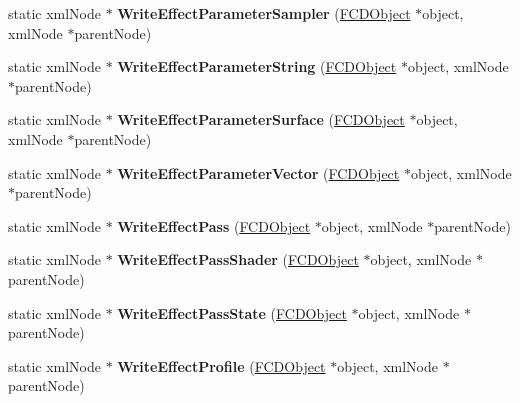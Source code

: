 \begin{DoxyCompactItemize}
\item 
\hypertarget{classFArchiveXML_a172090be69e194517e618dac85125112}{
static xmlNode $\ast$ {\bfseries WriteEffectParameterSampler} (\hyperlink{classFCDObject}{FCDObject} $\ast$object, xmlNode $\ast$parentNode)}
\label{classFArchiveXML_a172090be69e194517e618dac85125112}

\item 
\hypertarget{classFArchiveXML_afbbe4bd7c806738f10b0983dc3dcfb1e}{
static xmlNode $\ast$ {\bfseries WriteEffectParameterString} (\hyperlink{classFCDObject}{FCDObject} $\ast$object, xmlNode $\ast$parentNode)}
\label{classFArchiveXML_afbbe4bd7c806738f10b0983dc3dcfb1e}

\item 
\hypertarget{classFArchiveXML_ab36dc90780f7e11286440560e65d6c10}{
static xmlNode $\ast$ {\bfseries WriteEffectParameterSurface} (\hyperlink{classFCDObject}{FCDObject} $\ast$object, xmlNode $\ast$parentNode)}
\label{classFArchiveXML_ab36dc90780f7e11286440560e65d6c10}

\item 
\hypertarget{classFArchiveXML_a98909f975a7248398a4a6a1acc54ad8f}{
static xmlNode $\ast$ {\bfseries WriteEffectParameterVector} (\hyperlink{classFCDObject}{FCDObject} $\ast$object, xmlNode $\ast$parentNode)}
\label{classFArchiveXML_a98909f975a7248398a4a6a1acc54ad8f}

\item 
\hypertarget{classFArchiveXML_a6e11d622bef18fbcbac01a1fcbff58e7}{
static xmlNode $\ast$ {\bfseries WriteEffectPass} (\hyperlink{classFCDObject}{FCDObject} $\ast$object, xmlNode $\ast$parentNode)}
\label{classFArchiveXML_a6e11d622bef18fbcbac01a1fcbff58e7}

\item 
\hypertarget{classFArchiveXML_afbeb2fbcb6e08176a38fa7f73fbcc0df}{
static xmlNode $\ast$ {\bfseries WriteEffectPassShader} (\hyperlink{classFCDObject}{FCDObject} $\ast$object, xmlNode $\ast$parentNode)}
\label{classFArchiveXML_afbeb2fbcb6e08176a38fa7f73fbcc0df}

\item 
\hypertarget{classFArchiveXML_a03b67e399940cd8b4c84a8247549aa1b}{
static xmlNode $\ast$ {\bfseries WriteEffectPassState} (\hyperlink{classFCDObject}{FCDObject} $\ast$object, xmlNode $\ast$parentNode)}
\label{classFArchiveXML_a03b67e399940cd8b4c84a8247549aa1b}

\item 
\hypertarget{classFArchiveXML_a8017fd5292b911ac9a83654f67926fcd}{
static xmlNode $\ast$ {\bfseries WriteEffectProfile} (\hyperlink{classFCDObject}{FCDObject} $\ast$object, xmlNode $\ast$parentNode)}
\label{classFArchiveXML_a8017fd5292b911ac9a83654f67926fcd}


\end{DoxyCompactItemize}
